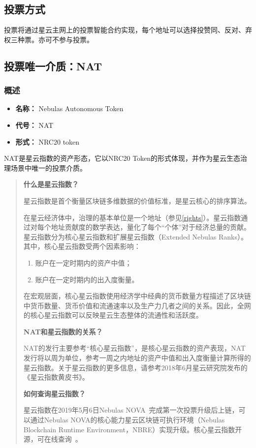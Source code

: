 \subsection{投票方式}

投票将通过星云主网上的投票智能合约实现，每个地址可以选择投赞同、反对、弃权三种票。亦可不参与投票。

\subsection{投票唯一介质：NAT}
\label{nat}

\subsubsection{概述}

\begin{itemize}
	\item \textbf{名称：} Nebulas Autonomous Token
	\item \textbf{代号：} NAT
	\item \textbf{形式：} NRC20 token
\end{itemize}

NAT是星云指数的资产形态，它以NRC20 Token的形式体现，并作为星云生态治理场景中唯一的投票介质。

\begin{quote}
	\textbf{什么是星云指数？}
		
	星云指数是首个衡量区块链多维数据的价值标准，是星云核心的排序算法。

	在星云经济体中，治理的基本单位是一个地址（参见\ref{rights}）。星云指数通过对每个地址贡献度的数学表达，量化了每个“个体”对于经济总量的贡献。星云指数分为核心星云指数和扩展星云指数（Extended Nebulas Ranks）。其中，核心星云指数受两个因素影响：

	\begin{enumerate}
		\item 账户在一定时期内的资产中值；
		\item 账户在一定时期内的出入度衡量。
	\end{enumerate}

	在宏观层面，核心星云指数使用经济学中经典的货币数量方程描述了区块链中货币数量、货币价值和流通速率以及生产力几者之间的关系。因此，全网的核心星云指数可以反映星云生态整体的流通性和活跃度。

	\vspace{2em}

	\textbf{NAT和星云指数的关系？}

	NAT的发行主要参考“核心星云指数”，是核心星云指数的资产表现，NAT发行将以周为单位，参考一周之内地址的资产中值和出入度衡量计算所得的星云指数。关于星云指数的更多信息，请参考2018年6月星云研究院发布的《星云指数黄皮书》。

	\vspace{2em}

	\textbf{如何查询星云指数？}

	星云指数在2019年5月6日Nebulas NOVA~\cite{nova}完成第一次投票升级后上链，可以通过Nebulas NOVA的核心能力星云区块链可执行环境（Nebulas Blockchain Runtime Environment，NBRE）实现升级。核心星云指数开源，可在线查询~\cite{CheckNR}。

\end{quote}

